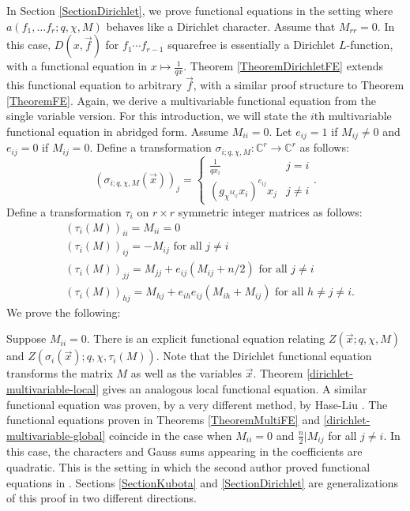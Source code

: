 \documentclass[11pt,letterpaper]{article}
\newenvironment{manualtheorem}[1]{%
  \IfBlankTF{#1}
    {\renewcommand{\themanualtheoreminner}{\unskip}}
    {\renewcommand\themanualtheoreminner{#1}}%
  \manualtheoreminner
}{\endmanualtheoreminner}
\theoremstyle{definition}
\theoremstyle{remark}
\numberwithin{equation}{section}
\theoremstyle{dotless}
\newcommand{\C}{\mathbb{C}}
\begin{document}
In Section \ref{SectionDirichlet}, we prove functional equations in the setting where $a(f_1, \ldots f_r; q, \chi, M)$ behaves like a Dirichlet character. Assume that $M_{rr}=0$. In this case, $D(x, \vec{f})$ for $f_1\cdots f_{r-1}$ squarefree is essentially a Dirichlet $L$-function, with a functional equation in $x \mapsto \frac{1}{qx}$. Theorem \ref{TheoremDirichletFE} extends this functional equation to arbitrary $\vec{f}$, with a similar proof structure to Theorem \ref{TheoremFE}. Again, we derive a multivariable functional equation from the single variable version. For this introduction, we will state the $i$th multivariable functional equation in abridged form. Assume $M_{ii}=0$. Let $e_{ij}=1$ if $M_{ij} \neq 0$ and $e_{ij}=0$ if $M_{ij}=0$. Define a transformation $\sigma_{i;q, \chi, M}:\C^r \to \C^r$ as follows:
\begin{equation}
(\sigma_{i;q, \chi, M}(\vec{x}))_j=\left\lbrace \begin{array}{cc}
\frac{1}{qx_i} & j=i \\ (g_{\chi^{M_{ij}}}x_i)^{e_{ij}}x_j & j \neq i \end{array} \right. .
\end{equation}
Define a transformation $\tau_i$ on $r \times r$ symmetric integer matrices as follows: 
\begin{equation}
\begin{split}
&(\tau_i(M))_{ii}=M_{ii}=0 \\
&(\tau_i(M))_{ij}=-M_{ij} \text{ for all } j\neq i \\
&(\tau_i(M))_{jj} = M_{jj}+e_{ij}(M_{ij}+n/2) \text{ for all } j\neq i \\
&(\tau_i(M))_{hj} = M_{hj}+e_{ih}e_{ij}(M_{ih}+M_{ij}) \text{ for all } h\neq j \neq i .
\end{split}
\end{equation}
We prove the following:
\begin{manualtheorem}{\ref{dirichlet-multivariable-global}}
Suppose $M_{ii}=0$. There is an explicit functional equation relating $Z(\vec{x}; q, \chi, M)$ and $Z(\sigma_i(\vec{x}); q, \chi, \tau_i(M))$. 
\end{manualtheorem}
\noindent Note that the Dirichlet functional equation transforms the matrix $M$ as well as the variables $\vec{x}$. Theorem \ref{dirichlet-multivariable-local} gives an analogous local functional equation. A similar functional equation was proven, by a very different method, by Hase-Liu \cite{HaseLiu24}. The functional equations proven in Theorems \ref{TheoremMultiFE} and \ref{dirichlet-multivariable-global} coincide in the case when $M_{ii}=0$ and $\frac{n}{2} | M_{ij}$ for all $j \neq i$. In this case, the characters and Gauss sums appearing in the coefficients are quadratic. This is the setting in which the second author proved functional equations in \cite{WhiteheadThesis}. Sections \ref{SectionKubota} and \ref{SectionDirichlet} are generalizations of this proof in two different directions. %
\end{document}
